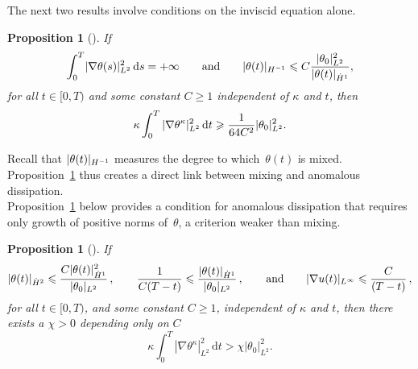 \documentclass[12pt]{report}   %
\renewcommand{\le}{\leqslant}
\renewcommand{\leq}{\leqslant}
\renewcommand{\geq}{\geqslant}
\newcommand{\grad}{\nabla}
\numberwithin{equation}{section}
\theoremstyle{plain}
\newtheorem{proposition}[lemma]{Proposition}
\theoremstyle{definition}
\theoremstyle{remark}
\DeclarePairedDelimiter{\abs}{\lvert}{\rvert}
\newcommand{\rmd}{\, \mathrm{d}}
\begin{document}
The next two results involve conditions on the inviscid equation alone.

\begin{proposition}[{\cite[Proposition~1.2]{DrivasElgindiEA22}}]\label{thm:criterion2}
  If
  \begin{equation}\label{e:crit2}
    \int_0^T \abs{\grad \theta(s)}_{L^2}^2 \rmd s = +\infty
    \qquad\text{and}\qquad
    |\theta(t)|_{H^{-1}}
      \leq C\frac{\abs{\theta_0}_{L^2}^2}{\abs{\theta(t)}_{\dot H^1}},
  \end{equation}
 for all $t \in [0, T)$ and some constant $C \geq 1$ independent of $\kappa$ and $t$, then
  \begin{equation*}
 \kappa \int_0^T |\nabla\theta^\kappa|^2_{L^2}\rmd t
      \geq
	  \frac{1}{64 C^2}{\abs{\theta_0}_{L^2}^2}.
  \end{equation*}
\end{proposition}


Recall that $\abs{\theta(t)}_{H^{-1}}$ measures the degree to which~$\theta(t)$ is mixed. Proposition~\ref{thm:criterion2} thus creates a direct link between mixing and anomalous dissipation. \\

Proposition~\ref{thm:criterion3} below provides a condition for anomalous dissipation that requires only growth of positive norms of~$\theta$, a criterion weaker than mixing.

\begin{proposition}[{\cite[Proposition~1.3]{DrivasElgindiEA22}}]\label{thm:criterion3}
  If
  \begin{equation}\label{e:crit3}
    |\theta(t)|_{\dot{H}^{2}}
      \le \frac{C |\theta(t)|_{\dot{H}^1}^2}{\abs{\theta_0}_{L^2}} \,,
    \qquad 
    \frac{1}{C(T-t)}
      \leq \frac{\abs{\theta(t)}_{\dot H^1}}{|\theta_0|_{L^2}} \,,
    \qquad \text{and} \qquad
   |\nabla u(t) |_{L^\infty} \leq  \frac{C}{(T-t)} \,,
  \end{equation}
  for all $t \in [0, T)$, and some constant $C\geq 1$, independent of $\kappa$ and $t$,  then there exists a $\chi>0$ depending only on $C$ 
  \begin{equation*}
   \kappa \int_0^T |\nabla \theta^\kappa|^2_{L^2}\rmd t>\chi|\theta_0|_{L^2}^2.
  \end{equation*}
\end{proposition}
\end{document}
